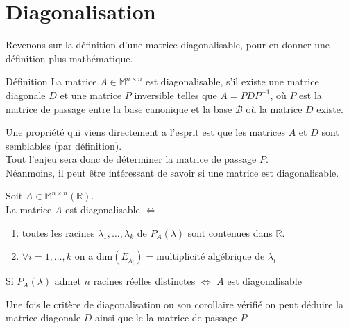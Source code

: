 \section{Diagonalisation}
Revenons sur la définition d'une matrice diagonalisable, pour en donner une définition plus mathématique.
\begin{bclogo}[couleur=blue!30,couleurBord=blue,arrondi=0.1,logo=\bcbook,ombre=true]{Définition}
La matrice $A\in\mathbb{M}^{n\times n}$ est diagonalisable, s'il existe une matrice diagonale $D$ et une matrice $P$ inversible telles que $A=PDP^{-1}$, où $P$ est la matrice de passage entre la base canonique et la base $\mathscr{B}$ où la matrice $D$ existe.
\end{bclogo}
Une propriété qui viens directement a l'esprit est que les matrices $A$ et $D$ sont semblables (par définition).\\
Tout l'enjeu sera donc de déterminer la matrice de passage $P$.\\
Néanmoins, il peut être intéressant de savoir si une matrice est diagonalisable. 
\begin{thm}
Soit $A\in\mathbb{M}^{n\times n}(\mathbb{R})$.\\
La matrice $A$ est diagonalisable $\Leftrightarrow$
\begin{enumerate}
    \item toutes les racines $\lambda_1,\hdots,\lambda_k$ de $P_A(\lambda)$ sont contenues dans $\mathbb{R}$.
    \item $\forall i=1,\hdots,k$ on a $\text{dim}(E_{\lambda_i})=\text{multiplicité algébrique de }\lambda_i$
\end{enumerate}

\end{thm}
\begin{thm}[Corollaire]
Si $P_A(\lambda)$ admet $n$ racines réelles distinctes $\Leftrightarrow$ $A$ est diagonalisable
\end{thm}
Une fois le critère de diagonalisation ou son corollaire vérifié on peut déduire la matrice diagonale $D$ ainsi que le la matrice de passage $P$
